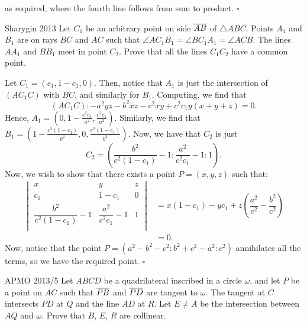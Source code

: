 \documentclass{article}
\begin{document}
as required, where the fourth line follows from sum to product. $\square$

\begin{problem}[7.44]{Sharygin 2013}
Let $C_1$ be an arbitrary point on side $\overline{AB}$ of $\triangle ABC$. Points $A_1$ and $B_1$ are on rays $BC$ and $AC$ such that $\angle AC_1B_1 = \angle BC_1A_1 = \angle ACB$. The lines $AA_1$ and $BB_1$ meet in point $C_2$. Prove that all the lines $C_1C_2$ have a common point.
\end{problem}

Let $C_1 = (c_1, 1-c_1, 0)$. Then, notice that $A_1$ is just the intersection of $(AC_1C)$ with $BC$, and similarly for $B_1$. Computing, we find that \[(AC_1C): -a^2yz-b^2xz-c^2xy+c^2c_1y(x+y+z) = 0.\] Hence, $A_1 = \left(0, 1-\tfrac{c^2c_1}{a^2},\tfrac{c^2c_1}{a^2}\right)$. Similarly, we find that $B_1 = \left(1-\tfrac{c^2(1-c_1)}{b^2}, 0, \tfrac{c^2(1-c_1)}{b^2}\right)$. Now, we have that $C_2$ is just \[C_2 = \left(\dfrac{b^2}{c^2(1-c_1)} - 1 : \dfrac{a^2}{c^2c_1} - 1 : 1\right).\] Now, we wish to show that there exists a point $P = (x, y, z)$ such that:
\begin{align*}
\begin{vmatrix}
x&y&z\\
c_1 & 1-c_1 & 0\\
\dfrac{b^2}{c^2(1-c_1)} - 1 & \dfrac{a^2}{c^2c_1} - 1 & 1 \\
\end{vmatrix}
&= x(1-c_1)-yc_1+z\left(\dfrac{a^2}{c^2}-\dfrac{b^2}{c^2}\right) \\
&= 0.
\end{align*}
Now, notice that the point $P = (a^2-b^2-c^2 : b^2+c^2-a^2 : c^2)$ annihilates all the terms, so we have the required point. $\square$

\begin{problem}[7.45]{APMO 2013/5}
Let $ABCD$ be a quadrilateral inscribed in a circle $\omega$, and let $P$ be a point on $AC$ such that $\overline{PB}$ and $\overline{PD}$ are tangent to $\omega$. The tangent at $C$ intersects $PD$ at $Q$ and the line $AD$ at $R$. Let $E \neq A$ be the intersection between $AQ$ and $\omega$. Prove that $B$, $E$, $R$ are collinear.
\end{problem}
\end{document}
